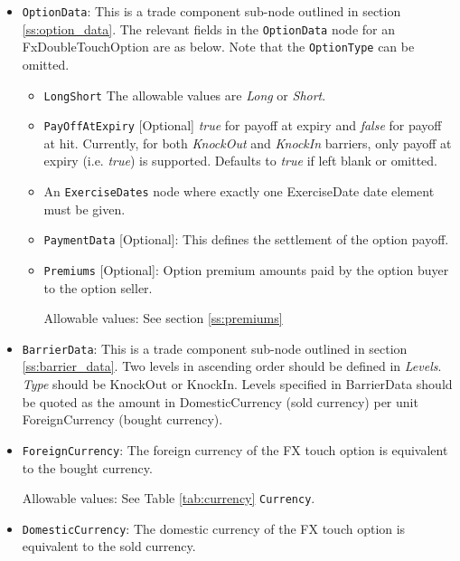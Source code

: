 \begin{itemize}

\item \lstinline!OptionData!: This is a trade component sub-node outlined in section \ref{ss:option_data}. 
The relevant fields in the \lstinline!OptionData! node for an FxDoubleTouchOption are as below. Note that the \lstinline!OptionType! can be omitted.

\begin{itemize}
\item \lstinline!LongShort! The allowable values are \emph{Long} or \emph{Short}.

\item  \lstinline!PayOffAtExpiry! [Optional] \emph{true} for payoff at expiry and \emph{false} for payoff at hit.
Currently, for both \emph{KnockOut} and \emph{KnockIn} barriers, only payoff at expiry (i.e. \emph{true}) is supported. Defaults to  \emph{true} if left blank or omitted.

\item An \lstinline!ExerciseDates! node where exactly one ExerciseDate date element must be given.

\item \lstinline!PaymentData! [Optional]: This defines the settlement of the option payoff.

\item \lstinline!Premiums! [Optional]: Option premium amounts paid by the option buyer to the option seller.

Allowable values:  See section \ref{ss:premiums}

\end{itemize}

\item \lstinline!BarrierData!: This is a trade component sub-node outlined in section \ref{ss:barrier_data}.
Two levels in ascending order should be defined in \emph{Levels}. \emph{Type} should be KnockOut or KnockIn. Levels specified in BarrierData should be quoted as the amount in DomesticCurrency (sold currency) per unit ForeignCurrency (bought currency).


\item \lstinline!ForeignCurrency!: The foreign currency of the FX touch option is equivalent to the bought currency.  

Allowable values:  See Table \ref{tab:currency} \lstinline!Currency!.

\item \lstinline!DomesticCurrency!: The domestic currency of the FX touch option is equivalent to the sold currency. 


\end{itemize}
